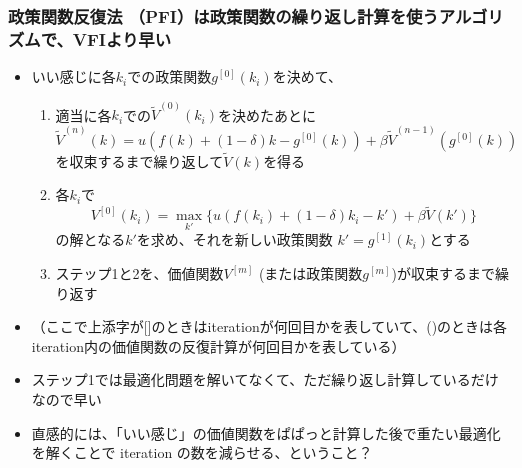 \documentclass[unicode,9pt]{beamer}%
\begin{document}
\begin{frame}\frametitle{政策関数反復法 （PFI）は政策関数の繰り返し計算を使うアルゴリズムで、VFIより早い}
  \begin{itemize}
    \item いい感じに各$k_i$での政策関数$g^{[0]}(k_i)$を決めて、
      \begin{enumerate}
        \item 適当に各$k_i$での$\tilde{V}^{(0)}(k_i)$を決めたあとに 
          $$
          \tilde{V}^{(n)}(k) = u(f(k) + (1 - \delta) k - g^{[0]}(k)) + \beta \tilde{V}^{(n-1)}(g^{[0]}(k))
          $$ を収束するまで繰り返して$\tilde{V}(k)$を得る
        \item 各$k_i$で 
          $$
          V^{[0]}(k_i) = \max_{k'} \{ u(f(k_i) + (1 - \delta) k_i - k') + \beta \tilde{V}(k') \}
          $$ の解となる$k'$を求め、それを新しい政策関数 $k' = g^{[1]}(k_i)$とする
        \item ステップ1と2を、価値関数$V^{[m]}$ (または政策関数$g^{[m]}$)が収束するまで繰り返す
      \end{enumerate}
    \item （ここで上添字が[]のときはiterationが何回目かを表していて、()のときは各iteration内の価値関数の反復計算が何回目かを表している）
    \item ステップ1では最適化問題を解いてなくて、ただ繰り返し計算しているだけなので早い
    \item 直感的には、「いい感じ」の価値関数をぱぱっと計算した後で重たい最適化を解くことで iteration の数を減らせる、ということ？
  \end{itemize}
\end{frame}
\end{document}
